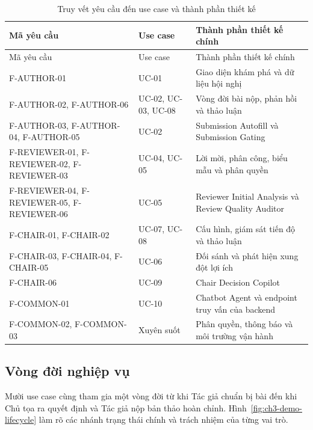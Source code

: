 \begingroup
\setlength{\tabcolsep}{2pt}
\begin{longtable}{|T{0.29\textwidth}|T{0.20\textwidth}|T{0.39\textwidth}|}
\caption{Truy vết yêu cầu đến use case và thành phần thiết kế}\label{tab:ch3-demo-requirement-trace}\\
\hline
Mã yêu cầu & Use case & Thành phần thiết kế chính \\ \hline
\endfirsthead
\hline
Mã yêu cầu & Use case & Thành phần thiết kế chính \\ \hline
\endhead
F-AUTHOR-01 & UC-01 & Giao diện khám phá và dữ liệu hội nghị \\ \hline
F-AUTHOR-02, F-AUTHOR-06 & UC-02, UC-03, UC-08 & Vòng đời bài nộp, phản hồi và thảo luận \\ \hline
F-AUTHOR-03, F-AUTHOR-04, F-AUTHOR-05 & UC-02 & Submission Autofill và Submission Gating \\ \hline
F-REVIEWER-01, F-REVIEWER-02, F-REVIEWER-03 & UC-04, UC-05 & Lời mời, phân công, biểu mẫu và phân quyền \\ \hline
F-REVIEWER-04, F-REVIEWER-05, F-REVIEWER-06 & UC-05 & Reviewer Initial Analysis và Review Quality Auditor \\ \hline
F-CHAIR-01, F-CHAIR-02 & UC-07, UC-08 & Cấu hình, giám sát tiến độ và thảo luận \\ \hline
F-CHAIR-03, F-CHAIR-04, F-CHAIR-05 & UC-06 & Đối sánh và phát hiện xung đột lợi ích \\ \hline
F-CHAIR-06 & UC-09 & Chair Decision Copilot \\ \hline
F-COMMON-01 & UC-10 & Chatbot Agent và endpoint truy vấn của backend \\ \hline
F-COMMON-02, F-COMMON-03 & Xuyên suốt & Phân quyền, thông báo và môi trường vận hành \\ \hline
\end{longtable}
\endgroup

\subsection{Vòng đời nghiệp vụ}

Mười use case cùng tham gia một vòng đời từ khi Tác giả chuẩn bị bài đến khi Chủ tọa ra quyết định và Tác giả nộp bản thảo hoàn chỉnh. Hình~\ref{fig:ch3-demo-lifecycle} làm rõ các nhánh trạng thái chính và trách nhiệm của từng vai trò.

